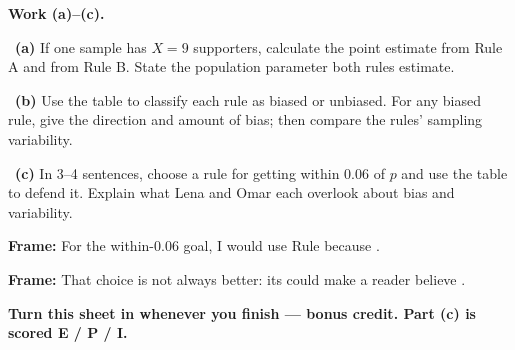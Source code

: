 \documentclass[11pt]{article}
\begin{document}
\newpage
\textbf{Work (a)--(c).}\par\smallskip

~\textbf{(a)} If one sample has $X=9$ supporters, calculate the point estimate from Rule A and from Rule B. State the population parameter both rules estimate.\par
\workspace{0.8in}

~\textbf{(b)} Use the table to classify each rule as biased or unbiased. For any biased rule, give the direction and amount of bias; then compare the rules' sampling variability.\par
\workspace{1.4in}

~\textbf{(c)} In 3--4 sentences, choose a rule for getting within 0.06 of $p$ and use the table to defend it. Explain what Lena and Omar each overlook about bias and variability.\par
\workspace{2.0in}

\begin{sentenceframebox}\raggedright\textbf{Frame:} For the within-0.06 goal, I would use Rule \blank[0.4in] because \blank[2.6in].\end{sentenceframebox}

\begin{sentenceframebox}\raggedright\textbf{Frame:} That choice is not always better: its \blank[1.2in] could make a reader believe \blank[2.5in].\end{sentenceframebox}

\textbf{Turn this sheet in whenever you finish --- bonus credit. Part (c) is scored E / P / I.}\par
\end{document}
